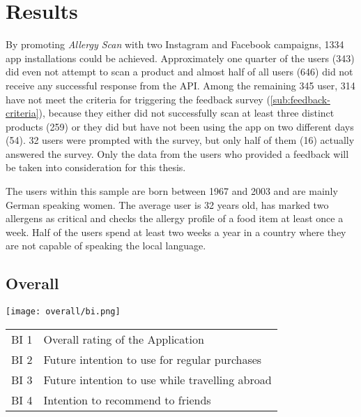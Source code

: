 \chapter{Results}
\thispagestyle{fancy}

By promoting \emph{Allergy Scan} with two Instagram and Facebook campaigns, 1334 app installations could be achieved. Approximately one quarter of the users (343) did even not attempt to scan a product and almost half of all users (646) did not receive any successful response from the API. Among the remaining 345 user, 314 have not meet the criteria for triggering the feedback survey (\cref{sub:feedback-criteria}), because they either did not successfully scan at least three distinct products (259) or they did but have not been using the app on two different days (54). 32 users were prompted with the survey, but only half of them (16) actually answered the survey. Only the data from the users who provided a feedback will be taken into consideration for this thesis.

The users within this sample are born between 1967 and 2003 and are mainly German speaking women. The average user is 32 years old, has marked two allergens as critical and checks the allergy profile of a food item at least once a week. Half of the users spend at least two weeks a year in a country where they are not capable of speaking the local language.



\section{Overall}


\begin{table}[H]
	\begin{minipage}{9cm}
		\centering
		\texttt{[image: overall/bi.png]}
		 \label{fig:overall-bi}
	\end{minipage}
	\begin{minipage}{4.5cm}
		
		\begin{tabular}{p{1cm} p{3.5cm}}

\toprule
BI 1    &   Overall rating of the Application \\
BI 2	&   Future intention to use for regular purchases \\
BI 3	&   Future intention to use while  travelling abroad \\
BI 4	&   Intention to recommend to friends \\
\bottomrule

\end{tabular}
	\end{minipage}\hfill

\end{table}


